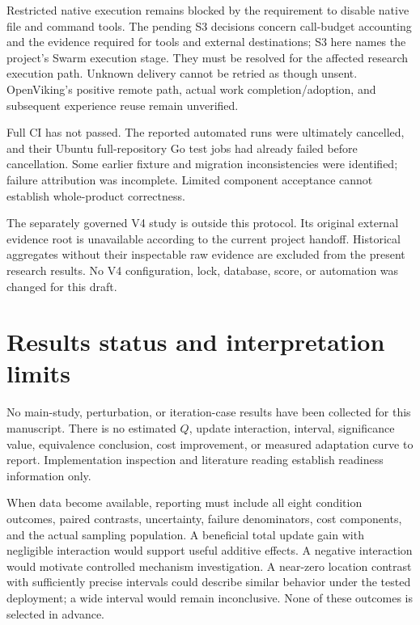 \documentclass[
  english,
  11pt,
]{article}
\begin{document}
Restricted native execution remains blocked by the requirement to
disable native file and command tools. The pending S3 decisions concern
call-budget accounting and the evidence required for tools and external
destinations; S3 here names the project's Swarm execution stage. They
must be resolved for the affected research execution path. Unknown
delivery cannot be retried as though unsent. OpenViking's positive
remote path, actual work completion/adoption, and subsequent experience
reuse remain unverified.

Full CI has not passed. The reported automated runs were ultimately
cancelled, and their Ubuntu full-repository Go test jobs had already
failed before cancellation. Some earlier fixture and migration
inconsistencies were identified; failure attribution was incomplete.
Limited component acceptance cannot establish whole-product correctness.

The separately governed V4 study is outside this protocol. Its original
external evidence root is unavailable according to the current project
handoff. Historical aggregates without their inspectable raw evidence
are excluded from the present research results. No V4 configuration,
lock, database, score, or automation was changed for this draft.

\section{Results status and interpretation
limits}\label{results-status-and-interpretation-limits}

No main-study, perturbation, or iteration-case results have been
collected for this manuscript. There is no estimated \(Q\), update
interaction, interval, significance value, equivalence conclusion, cost
improvement, or measured adaptation curve to report. Implementation
inspection and literature reading establish readiness information only.

When data become available, reporting must include all eight condition
outcomes, paired contrasts, uncertainty, failure denominators, cost
components, and the actual sampling population. A beneficial total
update gain with negligible interaction would support useful additive
effects. A negative interaction would motivate controlled mechanism
investigation. A near-zero location contrast with sufficiently precise
intervals could describe similar behavior under the tested deployment; a
wide interval would remain inconclusive. None of these outcomes is
selected in advance.
\end{document}
